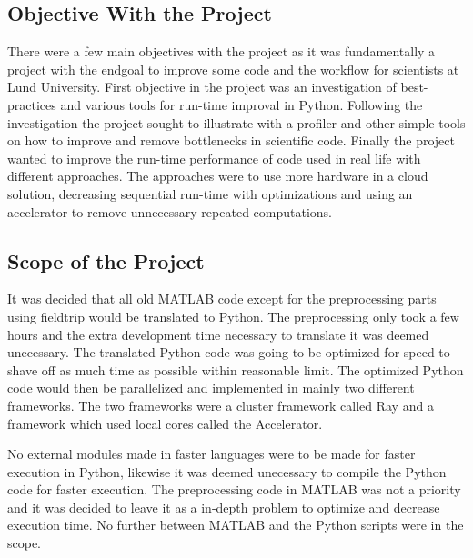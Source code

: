 \documentclass[12pt, a4paper]{article}
\begin{document}
\subsection{Objective With the Project}%

There were a few main objectives with the project as it was fundamentally a project with the endgoal to improve some code and the workflow for scientists at Lund University.
First objective in the project was an investigation of best-practices and various tools for run-time improval in Python.
Following the investigation the project sought to illustrate with a profiler and other simple tools on how to improve and remove bottlenecks in scientific code.
Finally the project wanted to improve the run-time performance of code used in real life with different approaches.
The approaches were to use more hardware in a cloud solution, decreasing sequential run-time with optimizations and using an accelerator to remove unnecessary repeated computations.

\subsection{Scope of the Project}%

It was decided that all old MATLAB code except for the preprocessing parts using fieldtrip would be translated to Python.
The preprocessing only took a few hours and the extra development time necessary to translate it was deemed unecessary. 
The translated Python code was going to be optimized for speed to shave off as much time as possible within reasonable limit.
The optimized Python code would then be parallelized and implemented in mainly two different frameworks.
The two frameworks were a cluster framework called Ray and a framework which used local cores called the Accelerator.

No external modules made in faster languages were to be made for faster execution in Python, likewise it was deemed unecessary to compile the Python code for faster execution.
The preprocessing code in MATLAB was not a priority and it was decided to leave it as a in-depth problem to optimize and decrease execution time.
No further between MATLAB and the Python scripts were in the scope.

\end{document}
